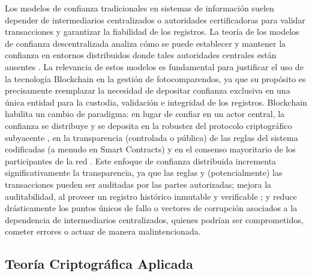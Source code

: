 \documentclass[
    letterpaper, 
    man,   
    spanish,
    12pt,
    donotrepeattitle,
    floatsintext,
    hidelinks %
]{apa7}
\begin{document}
Los modelos de confianza tradicionales en sistemas de información suelen depender de intermediarios centralizados o autoridades certificadoras para validar transacciones y garantizar la fiabilidad de los registros. La teoría de los modelos de confianza descentralizada analiza cómo se puede establecer y mantener la confianza en entornos distribuidos donde tales autoridades centrales están ausentes \parencite{swan2015blockchain}. La relevancia de estos modelos es fundamental para justificar el uso de la tecnología Blockchain en la gestión de fotocomparendos, ya que su propósito es precisamente reemplazar la necesidad de depositar confianza exclusiva en una única entidad para la custodia, validación e integridad de los registros. Blockchain habilita un cambio de paradigma: en lugar de confiar en un actor central, la confianza se distribuye y se deposita en la robustez del protocolo criptográfico subyacente \parencite{nakamoto2008bitcoin}, en la transparencia (controlada o pública) de las reglas del sistema codificadas (a menudo en Smart Contracts) y en el consenso mayoritario de los participantes de la red \parencite{antonopoulos2023mastering}. Este enfoque de confianza distribuida incrementa significativamente la transparencia, ya que las reglas y (potencialmente) las transacciones pueden ser auditadas por las partes autorizadas; mejora la auditabilidad, al proveer un registro histórico inmutable y verificable \parencite{swan2015blockchain}; y reduce drásticamente los puntos únicos de fallo o vectores de corrupción asociados a la dependencia de intermediarios centralizados, quienes podrían ser comprometidos, cometer errores o actuar de manera malintencionada. 

  

\subsection{Teoría Criptográfica Aplicada} 
\end{document}
